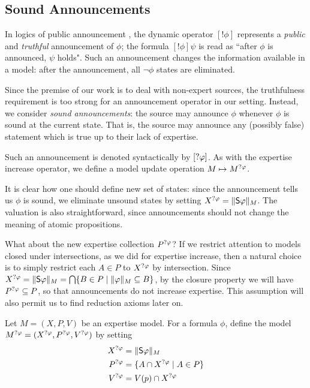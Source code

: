 \subsection{Sound Announcements}

In logics of public announcement \cite{plaza2007logics,van_Ditmarsch_2008},
the dynamic operator $[!\phi]$ represents a \emph{public} and \emph{truthful}
announcement of $\phi$; the formula $[!\phi]\psi$ is read as ``after
$\phi$ is announced, $\psi$ holds". Such an announcement changes
the information available in a model: after the announcement, all
$\neg\phi$ states are eliminated.

Since the premise of our work is to deal with non-expert sources, the
truthfulness requirement is too strong for an announcement operator in our
setting. Instead, we consider \emph{sound announcements}: the source may announce
$\phi$ whenever $\phi$ is sound at the current state. That is, the
source may announce any (possibly false) statement which is true up to their
lack of expertise.

Such an announcement is denoted syntactically by $[?\varphi]$. As with
the expertise increase operator, we define a model update operation
$M \mapsto M^{?\varphi}$.

It is clear how one should define new set of
states: since the announcement tells us $\phi$ is sound, we eliminate
unsound states by setting $X^{?\varphi} = \|\mathsf{S}\varphi\|_M$. The valuation
is also straightforward, since announcements should not change the meaning of
atomic propositions.

What about the new expertise collection $P^{?\varphi}$? If we restrict
attention to models closed under intersections, as we did for expertise
increase, then a natural choice is to simply restrict each $A \in P$ to
$X^{?\varphi}$ by intersection. Since $X^{?\varphi} =
\|\mathsf{S}\varphi\|_M = \bigcap\{B \in P \mid \|\varphi\|_M \subseteq B\}$, by the closure
property we will have $P^{?\varphi} \subseteq P$, so that
announcements do not increase expertise. This assumption will also permit us to
find reduction axioms later on.

\begin{definition}
\label{exp_def_sndann_model}
Let $M = (X, P, V)$ be an expertise model. For a formula $\phi$,
define the model $M^{?\varphi} = (X^{?\varphi}, P^{?\varphi},
V^{?\varphi})$ by setting
\[
\begin{aligned}
  X^{?\varphi} &= \|\mathsf{S}\varphi\|_M \\
  P^{?\varphi} &= \{A \cap X^{?\varphi} \mid A \in P\} \\
  V^{?\varphi} &= V(p) \cap X^{?\varphi}
\end{aligned}\]
\end{definition}


